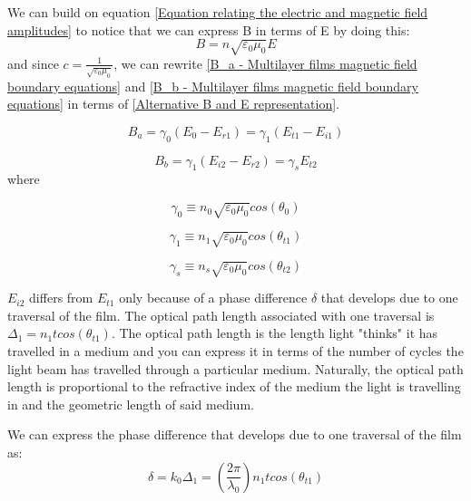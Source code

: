 We can build on equation \ref{Equation relating the electric and magnetic field amplitudes} to notice that we can express B in terms of E by doing this:
\begin{equation} \label{Alternative B and E representation}
B = n\sqrt{\varepsilon_0\mu_0}E
\end{equation}
and since $c=\frac{1}{\sqrt{\varepsilon_0\mu_0}}$, we can rewrite \ref{B_a - Multilayer films magnetic field boundary equations} and \ref{B_b - Multilayer films magnetic field boundary equations} in terms of \ref{Alternative B and E representation}.

\begin{equation} \label{Alternative B_a - Multilayer films magnetic field boundary equations}
B_a = \gamma_0(E_0 - E_{r1}) = \gamma_1(E_{t1} - E_{i1})
\end{equation}

\begin{equation} \label{Alternative B_b - Multilayer films magnetic field boundary equations}
B_b = \gamma_1(E_{i2} - E_{r2}) = \gamma_sE_{t2}
\end{equation}
where

\begin{equation} \label{gamma 0}
    \gamma_0 \equiv n_0 \sqrt{\varepsilon_0\mu_0} cos(\theta_0)
\end{equation}

\begin{equation} \label{gamma 1}
    \gamma_1 \equiv n_1 \sqrt{\varepsilon_0\mu_0} cos(\theta_{t1})
\end{equation}

\begin{equation} \label{gamma s}
    \gamma_s \equiv n_s \sqrt{\varepsilon_0\mu_0} cos(\theta_{t2})
\end{equation}


$E_{i2}$ differs from $E_{t1}$ only because of a phase difference $\delta$ that develops due to one traversal of the film. The optical path length associated with one traversal is $\Delta_1=n_1tcos(\theta_{t1})$. The optical path length is the length light "thinks" it has travelled in a medium and you can express it in terms of the number of cycles the light beam has travelled through a particular medium. Naturally, the optical path length is proportional to the refractive index of the medium the light is travelling in and the geometric length of said medium.

We can express the phase difference that develops due to one traversal of the film as:
\begin{equation} \label{phase difference}
\delta = k_0\Delta_1 = \left(\frac{2\pi}{\lambda_0}\right) n_1tcos(\theta_{t1})
\end{equation}

